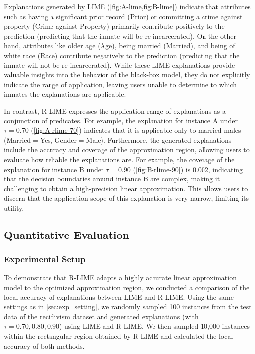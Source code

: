\documentclass[runningheads]{llncs}
\begin{document}
Explanations generated by LIME (\cref{fig:A-lime,fig:B-lime}) indicate that attributes such as having a significant prior record (Prior) or committing a crime against property (Crime against Property) primarily contribute positively to the prediction (predicting that the inmate will be re-incarcerated). On the other hand, attributes like older age (Age), being married (Married), and being of white race (Race) contribute negatively to the prediction (predicting that the inmate will not be re-incarcerated). While these LIME explanations provide valuable insights into the behavior of the black-box model, they do not explicitly indicate the range of application, leaving users unable to determine to which inmates the explanations are applicable.

In contrast, R-LIME expresses the application range of explanations
as a conjunction of predicates.
For example, the explanation for instance A
under $\tau=0.70$ (\cref{fig:A-rlime-70}) indicates that it is applicable
only to married males (Married$=$Yes, Gender$=$Male).
Furthermore, the generated explanations include the accuracy and coverage of
the approximation region, allowing users to evaluate how reliable the
explanations are.
For example, the coverage of the explanation for instance B under $\tau=0.90$
(\cref{fig:B-rlime-90}) is 0.002,
indicating that the decision boundaries around instance B are complex,
making it challenging to obtain a high-precision linear approximation.
This allows users to discern that the application scope of this explanation is
very narrow, limiting its utility.

\subsection{Quantitative Evaluation}\label{sec:exp2}
\subsubsection{Experimental Setup}
To demonstrate that R-LIME adapts a highly accurate linear approximation model
to the optimized approximation region,
we conducted a comparison of the local accuracy of explanations
between LIME and R-LIME.
Using the same settings as in \cref{sec:exp_setting},
we randomly sampled 100 instances from the test data of the recidivism dataset
and generated explanations (with $\tau=0.70,0.80,0.90$) using LIME and R-LIME.
We then sampled 10,000 instances within the rectangular region obtained by R-LIME and calculated the local accuracy of both methods.
\end{document}
